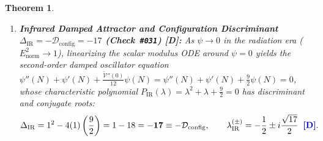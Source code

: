 \documentclass[11pt,a4paper]{article}
\newcommand{\catD}{\textbf{\textcolor{blue!75!black}{[D]}}}
\theoremstyle{plain}
\newtheorem{theorem}{Theorem}[section]
\theoremstyle{definition}
\theoremstyle{remark}
\numberwithin{equation}{section}
\begin{document}
\begin{theorem}
\begin{enumerate}
  \begin{equation}
    \lambda^2 + \lambda + \frac{\widetilde{\mathcal{V}}''(\psi_{\max}^{\text{(BH)}})}{12 \times (7/6)} = \lambda^2 + \lambda - \frac{3}{7} = 0 \quad \Longrightarrow \quad \lambda_{\text{UV}}^{(+)} = \frac{\sqrt{19/7} - 1}{2} = \mathbf{+0.3237544710\dots} \;\;\catD.
    \label{eq:uv_lyapunov_root_p3}
  \end{equation}
  \item[\textnormal{(iii)}] \textbf{Infrared Damped Attractor and Configuration Discriminant $\Delta_{\text{IR}} = -\mathcal{D}_{\text{config}} = -17$ (Check~\texttt{\#031}) \catD:} As $\psi \to 0$ in the radiation era ($E_{\text{norm}}^2 \to 1$), linearizing the scalar modulus ODE around $\psi = 0$ yields the second-order damped oscillator equation $\psi''(N) + \psi'(N) + \frac{\widetilde{\mathcal{V}}''(0)}{12}\psi(N) = \psi''(N) + \psi'(N) + \frac{9}{2}\psi(N) = 0$, whose characteristic polynomial $P_{\text{IR}}(\lambda) = \lambda^2 + \lambda + \frac{9}{2} = 0$ has discriminant and conjugate roots:
  \begin{equation}
    \Delta_{\text{IR}} = 1^2 - 4(1)\left(\frac{9}{2}\right) = 1 - 18 = \mathbf{-17 \equiv -\mathcal{D}_{\text{config}}}, \qquad \lambda_{\text{IR}}^{(\pm)} = -\frac{1}{2} \pm i\frac{\sqrt{17}}{2} \;\;\catD.
    \label{eq:ir_discriminant_17_p3}
  \end{equation}
\end{enumerate}
\end{theorem}
\end{document}
